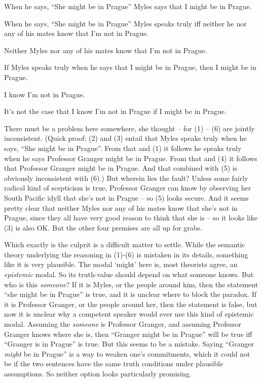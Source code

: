 \documentclass[
  10pt,
  letterpaper,
  DIV=11,
  numbers=noendperiod,
  twoside]{scrartcl}
\providecommand{\tightlist}{%
  \setlength{\itemsep}{0pt}\setlength{\parskip}{0pt}}\usepackage{longtable,booktabs,array}
\begin{document}
\begin{description}
\tightlist
\item[(1)]
When he says, ``She might be in Prague'' Myles says that I might be in
Prague.
\item[(2)]
When he says, ``She might be in Prague'' Myles speaks truly iff neither
he nor any of his mates know that I'm not in Prague.
\item[(3)]
Neither Myles nor any of his mates know that I'm not in Prague.
\item[(4)]
If Myles speaks truly when he says that I might be in Prague, then I
might be in Prague.
\item[(5)]
I know I'm not in Prague.
\item[(6)]
It's not the case that I know I'm not in Prague if I might be in Prague.
\end{description}

There must be a problem here somewhere, she thought -- for (1) -- (6)
are jointly inconsistent. (Quick proof: (2) and (3) entail that Myles
speaks truly when he says, ``She might be in Prague''. From that and (1)
it follows he speaks truly when he says Professor Granger might be in
Prague. From that and (4) it follows that Professor Granger might be in
Prague. And that combined with (5) is obviously inconsistent with (6).)
But wherein lies the fault? Unless some fairly radical kind of
scepticism is true, Professor Granger can know by observing her South
Pacific idyll that she's not in Prague -- so (5) looks secure. And it
seems pretty clear that neither Myles nor any of his mates know that
she's not in Prague, since they all have very good reason to think that
she is -- so it looks like (3) is also OK. But the other four premises
are all up for grabs.

Which exactly is the culprit is a difficult matter to settle. While the
semantic theory underlying the reasoning in (1)-(6) is mistaken in its
details, something like it is very plausible. The modal `might' here is,
most theorists agree, an \emph{epistemic} modal. So its truth-value
should depend on what someone knows. But who is this \emph{someone}? If
it is Myles, or the people around him, then the statement ``she might be
in Prague'' is true, and it is unclear where to block the paradox. If it
is Professor Granger, or the people around her, then the statement is
false, but now it is unclear why a competent speaker would ever use this
kind of epistemic modal. Assuming the \emph{someone} is Professor
Granger, and assuming Professor Granger knows where she is, then
``Granger might be in Prague'' will be true iff ``Granger is in Prague''
is true. But this seems to be a mistake. Saying ``Granger \emph{might}
be in Prague'' is a way to weaken one's commitments, which it could not
be if the two sentences have the same truth conditions under plausible
assumptions. So neither option looks particularly promising.
\end{document}
